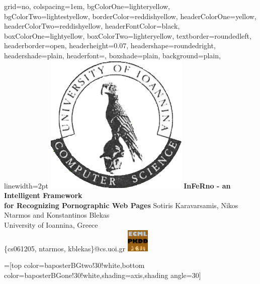 \documentclass[portrait,a0paper,final,margin=6em]{baposter}
\begin{document}
\begin{poster}{
  grid=no,
  colspacing=1em,
  bgColorOne=lighteryellow,
  bgColorTwo=lightestyellow,
  borderColor=reddishyellow,
  headerColorOne=yellow,
  headerColorTwo=reddishyellow,
  headerFontColor=black,
  boxColorOne=lightyellow,
  boxColorTwo=lighteryellow,
  textborder=roundedleft,
  headerborder=open,
  headerheight=0.07\textheight,
  headershape=roundedright,
  headershade=plain,
  headerfont=\Large\textsf, %
  boxshade=plain,
  background=plain,
  linewidth=2pt
  }
  {
      \includegraphics[width=0.1\linewidth]{UOI-logo}   
  }
  {\sf %
  \LARGE\bf{{InFeRno - an Intelligent Framework \\ for Recognizing Pornographic Web Pages}}}
  {\sf %
  	\vspace{-0.01em}\large{Sotiris Karavarsamis, Nikos Ntarmos and Konstantinos Blekas  \\
     [-0.3em]\normalsize University of Ioannina, Greece}\\
     [-0.3em]\small \{cs061205, ntarmos, kblekas\}@cs.uoi.gr   }
  {
      \includegraphics[width=0.11\linewidth,height=3em]{ecml2011}   
  }

  =[top color=baposterBGtwo!30!white,bottom color=baposterBGone!30!white,shading=axis,shading angle=30]


\end{poster}
\end{document}
